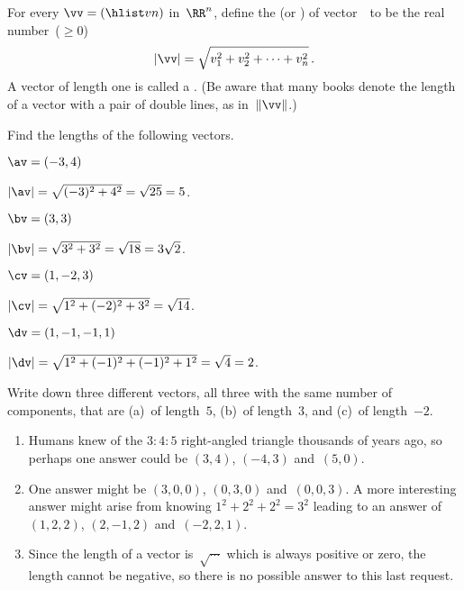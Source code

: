 \begin{definition}[Pythagoras] \label{def:veclen}
For every  \(\vv=(\hlist vn)\) in~\(\RR^n\),
define the  (or ) of vector~\vv\  to be the real number~(\(\geq0\))
\begin{equation*}
|\vv|=\sqrt{v_1^2+v_2^2+\cdots+v_n^2}\,.
\end{equation*}
A vector of length one is called a .
(Be aware that many books denote the length of a vector with a pair of double lines, as in~\(\|\vv\|\).)
\end{definition}


\begin{example} \label{eg:}
Find the lengths of the following vectors.
\begin{parts}
\item \(\av=(-3,4)\)
\begin{solution} 
\(|\av|=\sqrt{(-3)^2+4^2}=\sqrt{25}=5\). 
\end{solution}

\item \(\bv=(3,3)\)
\begin{solution} 
\(|\bv|=\sqrt{3^2+3^2}=\sqrt{18}=3\sqrt2\). 
\end{solution}


\item \(\cv=(1,-2,3)\)
\begin{solution} 
\(|\cv|=\sqrt{1^2+(-2)^2+3^2}=\sqrt{14}\). 
\end{solution}

\item \(\dv=(1,-1,-1,1)\)
\begin{solution} 
\(|\dv|=\sqrt{1^2+(-1)^2+(-1)^2+1^2}=\sqrt4=2\).
\end{solution}
\end{parts}
\end{example}

\begin{example} \label{eg:}
Write down three different vectors, all three with the same number of components, that are (a)~of length~\(5\), (b)~of length~\(3\), and (c)~of length~\(-2\).
\begin{solution} 
\begin{enumerate}
\item Humans knew of the \(3:4:5\) right-angled triangle thousands of years ago, so perhaps one answer could be \((3,4)\), \((-4,3)\) and~\((5,0)\).
\item One answer might be \((3,0,0)\), \((0,3,0)\) and~\((0,0,3)\). 
A more interesting answer might arise from knowing \(1^2+2^2+2^2=3^2\) leading to an answer of \((1,2,2)\), \((2,-1,2)\) and~\((-2,2,1)\).
\item Since the length of a vector is~\(\sqrt{\cdots}\) which is always positive or zero, the length cannot be negative, so there is no possible answer to this last request.
\end{enumerate}
 
\end{solution}
\end{example}





